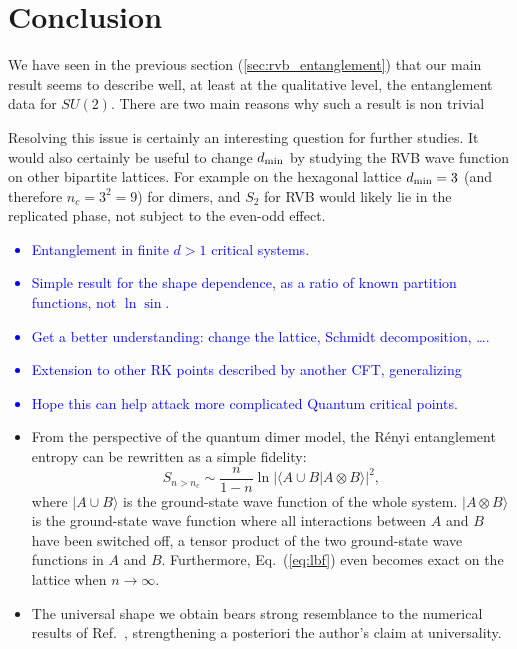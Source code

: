 \documentclass[11pt]{iopart}
\begin{document}
\section{Conclusion}

We have seen in the previous section (\ref{sec:rvb_entanglement}) that our main result seems to describe well, at least at the qualitative level, the entanglement data for $SU(2)$. There are two main reasons why such a result is non trivial

Resolving this issue is certainly an interesting question for further studies. It would also certainly be useful to change $d_{\rm min}$ by studying the RVB wave function on other bipartite lattices. For example on the hexagonal lattice $d_{\rm min}=3$ (and therefore $n_c=3^2=9$) for dimers, and $S_2$ for RVB would likely lie in the replicated phase, not subject to the even-odd effect. 


\label{sec:conclusion}
\textcolor{blue}{
\begin{itemize}
 \item Entanglement in finite $d>1$ critical systems. 
 \item Simple result for the shape dependence, as a ratio of known partition functions, not $\ln \sin$.
 \item Get a better understanding: change the lattice, Schmidt decomposition, \ldots.
 \item Extension to other RK points described by another CFT, generalizing\cite{Stephan2010,Zaletel}
 \item Hope this can help attack more complicated Quantum critical points.
\end{itemize}
}

\begin{itemize}
\item 
 From the perspective of the quantum dimer model, the R\'enyi entanglement entropy can be rewritten as a simple fidelity\cite{Bipartite_fidelity}:
 \begin{equation}\label{eq:lbf}
  S_{n>n_c}\sim \frac{n}{1-n} \ln \left|\langle A\cup B|A\otimes B\rangle\right|^2,
 \end{equation}
where $|A\cup B\rangle$ is the ground-state wave function of the whole system. $|A\otimes B\rangle$ is the ground-state wave function where all interactions between $A$ and $B$ have been switched off, a tensor product of the two ground-state wave functions in $A$ and $B$. Furthermore, Eq.~(\ref{eq:lbf}) even becomes exact on the lattice when $n\to \infty$.
 \item The universal shape we obtain bears strong resemblance to the numerical results of Ref.~\cite{Ju2012}, strengthening a posteriori the author's claim at universality.  
  \end{itemize}
\end{document}
